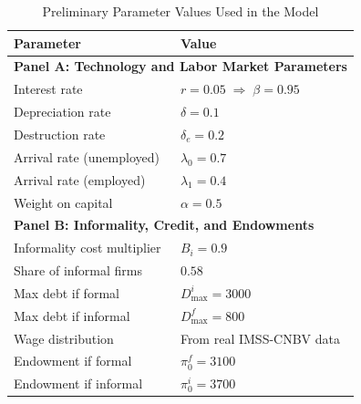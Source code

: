 \begin{table}[H]
\centering
\caption{Preliminary Parameter Values Used in the Model}
\label{tab:parameters_twocol}
\begin{tabularx}{0.95\textwidth}{X X}
\hline\hline
\textbf{Parameter} & \textbf{Value} \\
\hline
\multicolumn{2}{l}{\textbf{Panel A: Technology and Labor Market Parameters}} \\[1mm]
Interest rate & $r = 0.05 \;\Rightarrow\; \beta = 0.95$ \\
Depreciation rate & $\delta = 0.1$ \\
Destruction rate & $\delta_e = 0.2$ \\
Arrival rate (unemployed) & $\lambda_0 = 0.7$ \\
Arrival rate (employed) & $\lambda_1 = 0.4$ \\
Weight on capital & $\alpha = 0.5$ \\
\hline
\multicolumn{2}{l}{\textbf{Panel B: Informality, Credit, and Endowments}} \\[1mm]
Informality cost multiplier & $B_i = 0.9$ \\
Share of informal firms & $0.58$ \\
Max debt if formal & $D^{i}_{\max} = 3000$ \\
Max debt if informal & $D^{f}_{\max} = 800$ \\
Wage distribution & From real IMSS-CNBV data \\
Endowment if formal & $\pi^{f}_0 = 3100$ \\
Endowment if informal & $\pi^{i}_0 = 3700$ \\
\hline\hline
\end{tabularx}
\end{table}

